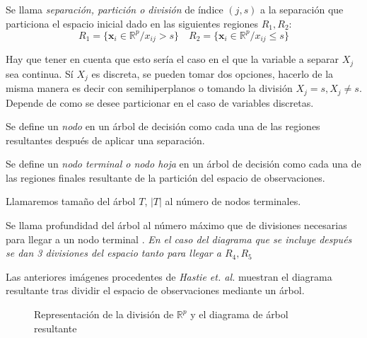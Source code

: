 \begin{defi}
Se llama \emph{separación, partición o división} de índice $(j,s)$ \cite{Hastie 2001} a la separación que particiona el espacio inicial dado en las siguientes regiones $R_1,R_2$:
\begin{equation}
R_1=\lbrace \mathbf{x}_i \in \mathbb{R}^p/ x_{ij}>s\rbrace \quad R_2=\lbrace \mathbf{x}_i \in \mathbb{R}^p/ x_{ij}\leq s\rbrace
\end{equation}

\noindent Hay que tener en cuenta que esto sería el caso en el que la variable a separar $X_j$ sea continua. Sí $X_j$ es discreta, se pueden tomar dos opciones, hacerlo de la misma manera es decir con semihiperplanos o tomando la división $X_j=s, X_j\neq s$. Depende de como se desee particionar en el caso de variables discretas. 
\end{defi}
\begin{defi}
Se define un \emph{nodo} en un árbol de decisión como cada una de las regiones resultantes después de aplicar una separación.
\end{defi}
\begin{defi}
Se define un \emph{nodo terminal o nodo hoja}    \cite{Brown 2004} en un árbol de decisión como cada una de las regiones finales resultante de la partición del espacio de observaciones.
\end{defi}
\begin{defi}
Llamaremos tamaño del árbol $T$, $|T|$ al número de nodos terminales. 
\end{defi}
\begin{defi}
Se llama profundidad del árbol al número máximo que de divisiones necesarias para llegar a un nodo terminal \cite{Hastie 2001}. \emph{En el caso del diagrama que se incluye después se dan 3 divisiones del espacio tanto para llegar a $R_4, R_5$}
\end{defi}
\noindent Las  anteriores imágenes procedentes de \textit{Hastie et. al.}\cite{Hastie 2001} muestran el diagrama resultante tras dividir el espacio de observaciones mediante un árbol. 

\begin{figure}[h]
 \centering
 \caption{Representación de la división de $\mathbb{R}^p$ y el diagrama de árbol resultante}
 \label{f:MARC1}
\end{figure}

